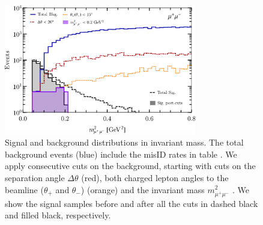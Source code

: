 \begin{figure}[t]
\centering
\includegraphics[width = 0.75\textwidth]{figs/SigvsBkg.pdf}
 \caption[Kinematical cuts on background samples for dimuon tridents.]{Signal and background distributions in invariant mass. The total background events (blue) include the misID rates in table . We apply consecutive cuts on the background, starting with cuts on the separation angle $\Delta \theta$ (red), both charged lepton angles to the beamline ($\theta_+$ and $\theta_-$) (orange) and the invariant mass $m^2_{\mu^+ \mu^-}$ . We show the signal samples before and after all the cuts in dashed black and filled black, respectively. \label{fig:bkg_flow}}
\end{figure}
%
